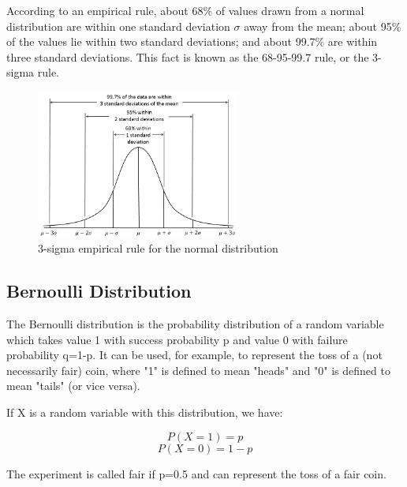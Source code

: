 According to an empirical rule, about 68\% of values drawn from a normal distribution are within one standard deviation \(\sigma\) away from the mean; 
about 95\% of the values lie within two standard deviations; and about 99.7\% are within three standard deviations. This fact is known as the 68-95-99.7 
rule, or the 3-sigma rule.

\begin{figure}[H]
  \centering
  \includegraphics[width=0.6\textwidth]{figures/Empirical_Rule.PNG}
  \caption{3-sigma empirical rule for the normal distribution}
\end{figure}

\subsection{Bernoulli Distribution}

The Bernoulli distribution is the probability distribution of a random variable which takes value 1 with success probability p and value 0 with failure 
probability q=1-p. It can be used, for example, to represent the toss of a (not necessarily fair) coin, where "1" is defined to mean "heads" and "0" is 
defined to mean "tails" (or vice versa).

If X is a random variable with this distribution, we have:

\[P(X=1) = p\]
\[P(X=0) = 1-p\]

The experiment is called fair if p=0.5 and can represent the toss of a fair coin. 
















